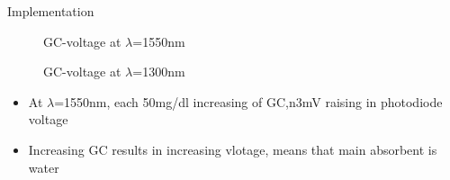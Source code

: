 \documentclass[fontsize=11pt,aspectratio=169,t,fleqn]{beamer}
\begin{document}
\begin{frame}{Implementation}
    \begin{figure}[!htb]\centering
        \begin{minipage}{0.5\textwidth}
          \caption{GC-voltage at $\lambda$=1550nm}
        \end{minipage}
        \begin {minipage}{0.48\textwidth}
          \caption{GC-voltage at $\lambda$=1300nm}
        \end{minipage}
     \end{figure}
   \begin{itemize}  
     \item At $\lambda$=1550nm, each 50mg/dl increasing of GC,n3mV raising in photodiode voltage
     \item Increasing GC results in increasing vlotage, means that main absorbent is water
   \end{itemize}
\end{frame}
\end{document}
